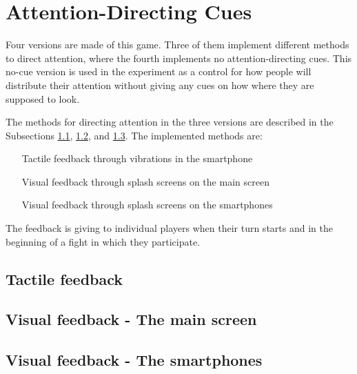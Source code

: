 \section{Attention-Directing Cues}
Four versions are made of this game. Three of them implement different methods to direct attention, where the fourth implements no attention-directing cues. This no-cue version is used in the experiment as a control for how people will distribute their attention without giving any cues on how where they are supposed to look.

The methods for directing attention in the three versions are described in the Subsections \ref{sub:tactile_feedback}, \ref{sub:visual_main}, and \ref{sub:visual_smartphone}. The implemented methods are:

\begin{itemize}
\item[Tactile feedback through vibrations in the smartphone]
\item[Visual feedback through splash screens on the main screen]
\item[Visual feedback through splash screens on the smartphones]
\end{itemize}

The feedback is giving to individual players when their turn starts and in the beginning of a fight in which they participate.

\subsection{Tactile feedback}\label{sub:tactile_feedback}


\subsection{Visual feedback - The main screen}\label{sub:visual_main}


\subsection{Visual feedback - The smartphones}\label{sub:visual_smartphone}
